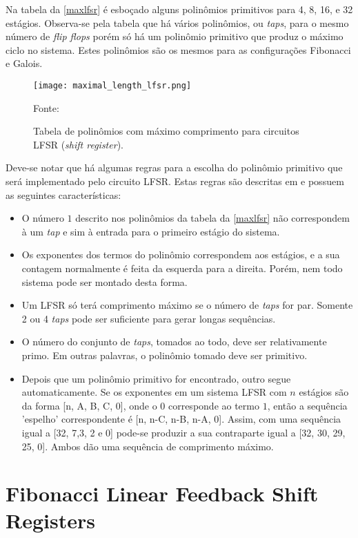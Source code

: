 Na tabela da \autoref{maxlfsr} é esboçado alguns polinômios primitivos para 4, 8, 16, e 32 estágios. Observa-se pela tabela que há vários polinômios, ou \textit{taps}, para o mesmo número de \textit{flip flops} porém só há um polinômio primitivo que produz o máximo ciclo no sistema. Estes polinômios são os mesmos para as configurações Fibonacci e Galois. 

\begin{figure}[H]
	\caption{\label{maxlfsr}Tabela de polinômios com máximo comprimento para circuitos LFSR (\textit{shift register}).}
	\centering
	\texttt{[image: maximal\_length\_lfsr.png]}
	\begin{center}
		Fonte: \cite{Abinaya2014}
	\end{center}	
\end{figure}

Deve-se notar que há algumas regras para a escolha do polinômio primitivo que será implementado pelo circuito LFSR. Estas regras são descritas em \cite{Abinaya2014} e possuem as seguintes características:

\begin{itemize}
	\item O número $1$ descrito nos polinômios da tabela da \autoref{maxlfsr} não correspondem à um \textit{tap} e sim à entrada para o primeiro estágio do sistema.
	\item Os exponentes dos termos do polinômio correspondem aos estágios, e a sua contagem normalmente é feita da esquerda para a direita. Porém, nem todo sistema pode ser montado desta forma. 
	\item Um LFSR só terá comprimento máximo se o número de \textit{taps} for par. Somente 2 ou 4 \textit{taps} pode ser suficiente para gerar longas sequências.
	\item O número do conjunto de \textit{taps}, tomados ao todo, deve ser relativamente primo. Em outras palavras, o polinômio tomado deve ser primitivo.
	\item Depois que um polinômio primitivo for encontrado, outro segue automaticamente. Se os exponentes em um sistema LFSR com $ n $ estágios são da forma [n, A, B, C, 0], onde o 0 corresponde ao termo $1$, então a sequência 'espelho' correspondente é [n, n-C, n-B, n-A, 0]. Assim, com uma sequência igual a [32, 7,3, 2 e 0] pode-se produzir a sua contraparte igual a [32, 30, 29, 25, 0]. Ambos dão uma sequência de comprimento máximo.
\end{itemize}


\section{Fibonacci Linear Feedback Shift Registers}

